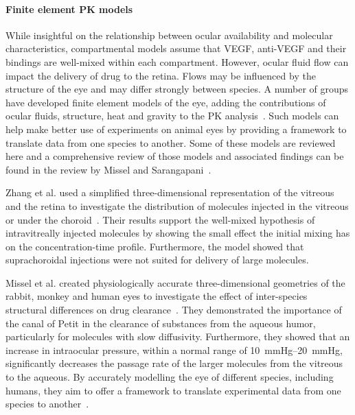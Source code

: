 \documentclass{article}
\begin{document}
\paragraph*{Finite element PK models}

While insightful on the relationship between ocular availability and molecular characteristics, compartmental models assume that VEGF, anti-VEGF and their bindings are well-mixed within each compartment.
However, ocular fluid flow can impact the delivery of drug to the retina.
Flows may be influenced by the structure of the eye and may differ strongly between species.
A number of groups have developed finite element models of the eye, adding the contributions of ocular fluids, structure, heat and gravity to the PK analysis~\cite{Lamminsalo_2018, Missel_2012, Zhang_2018}.
Such models can help make better use of experiments on animal eyes by providing a framework to translate data from one species to another.
Some of these models are reviewed here and a comprehensive review of those models and associated findings can be found in the review by Missel and Sarangapani~\cite{Missel_2019}.

Zhang et al. used a simplified three-dimensional representation of the vitreous and the retina to investigate the distribution of molecules injected in the vitreous or under the choroid~\cite{Zhang_2018}.
Their results support the well-mixed hypothesis of intravitreally injected molecules by showing the small effect the initial mixing has on the concentration-time profile.
Furthermore, the model showed that suprachoroidal injections were not suited for delivery of large molecules.

Missel et al. created physiologically accurate three-dimensional geometries of the rabbit, monkey and human eyes to investigate the effect of inter-species structural differences on drug clearance~\cite{Missel_2012}.  
They demonstrated the importance of the canal of Petit in the clearance of substances from the aqueous humor, particularly for molecules with slow diffusivity. 
Furthermore, they showed that an increase in intraocular pressure, within a normal range of \SIrange[range-units = single]{10}{20}{\mmHg}, significantly decreases the passage rate of the larger molecules from the vitreous to the aqueous.
By accurately modelling the eye of different species, including humans, they aim to offer a framework to translate experimental data from one species to another~\cite{Missel_2012}.
\end{document}
